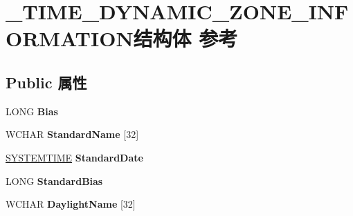 \hypertarget{struct___t_i_m_e___d_y_n_a_m_i_c___z_o_n_e___i_n_f_o_r_m_a_t_i_o_n}{}\section{\+\_\+\+T\+I\+M\+E\+\_\+\+D\+Y\+N\+A\+M\+I\+C\+\_\+\+Z\+O\+N\+E\+\_\+\+I\+N\+F\+O\+R\+M\+A\+T\+I\+O\+N结构体 参考}
\label{struct___t_i_m_e___d_y_n_a_m_i_c___z_o_n_e___i_n_f_o_r_m_a_t_i_o_n}
\subsection*{Public 属性}
\begin{DoxyCompactItemize}
\item 
\mbox{\label{struct___t_i_m_e___d_y_n_a_m_i_c___z_o_n_e___i_n_f_o_r_m_a_t_i_o_n_a05eba7d4c0c783585ae1f2e1399a1a2c}} 
L\+O\+NG {\bfseries Bias}
\item 
\mbox{\label{struct___t_i_m_e___d_y_n_a_m_i_c___z_o_n_e___i_n_f_o_r_m_a_t_i_o_n_addc416bc57f620822c118373409cbff1}} 
W\+C\+H\+AR {\bfseries Standard\+Name} \mbox{[}32\mbox{]}
\item 
\mbox{\label{struct___t_i_m_e___d_y_n_a_m_i_c___z_o_n_e___i_n_f_o_r_m_a_t_i_o_n_a02804b5bbfc0465eaf87f9e1f21c2ae6}} 
\hyperlink{struct___s_y_s_t_e_m_t_i_m_e}{S\+Y\+S\+T\+E\+M\+T\+I\+ME} {\bfseries Standard\+Date}
\item 
\mbox{\label{struct___t_i_m_e___d_y_n_a_m_i_c___z_o_n_e___i_n_f_o_r_m_a_t_i_o_n_ae449f8490b9c84c30141b7967eaf0353}} 
L\+O\+NG {\bfseries Standard\+Bias}
\item 
\mbox{\label{struct___t_i_m_e___d_y_n_a_m_i_c___z_o_n_e___i_n_f_o_r_m_a_t_i_o_n_a7419448fddc0c2d5beed07a6987bbb5f}} 
W\+C\+H\+AR {\bfseries Daylight\+Name} \mbox{[}32\mbox{]}
\item 

\end{DoxyCompactItemize}
